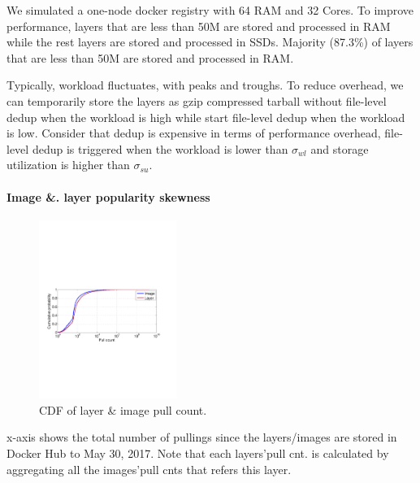 We simulated a one-node docker registry with 64 RAM and 32 Cores. 
To improve performance, layers that are less than 50M are stored and processed in RAM while the rest layers are stored and processed in SSDs. Majority (87.3\%) of layers that are less than 50M are stored and processed in RAM.

Typically, workload fluctuates, with peaks and troughs. To reduce overhead, we can temporarily store the layers as gzip compressed tarball without file-level dedup when the workload is high while start file-level dedup when the workload is low. Consider that dedup is expensive in terms of performance overhead, file-level dedup is triggered when the workload is lower than $\sigma_{wl}$ and storage utilization is higher than $\sigma_{su}$.

\paragraph{Image \&. layer popularity skewness} 


\begin{figure}
	\centering
	\includegraphics[width=0.4\textwidth]{graphs/pull-cnt.pdf}
	\caption{CDF of layer \& image pull count.
	}
	\label{fig:pull-cnt}
\end{figure}

x-axis shows the total number of pullings since the layers/images are stored in Docker Hub to May 30, 2017. Note that each layers'pull cnt. is calculated by aggregating all the images'pull cnts that refers this layer.

